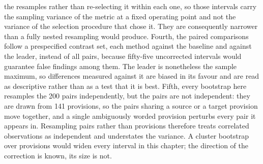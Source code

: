 the resamples rather than re-selecting it within each one, so those intervals
carry the sampling variance of the metric at a fixed operating point and not the
variance of the selection procedure that chose it. They are consequently
narrower than a fully nested resampling would produce. Fourth, the paired
comparisons follow a prespecified contrast set, each method
against the baseline and against the leader, instead of all pairs, because
fifty-five uncorrected intervals would guarantee false findings among them. The
leader is nonetheless the sample maximum, so differences measured against it are
biased in its favour and are read as descriptive rather than as a test that it is
best. Fifth, every bootstrap here resamples the 200 pairs independently, but the
pairs are not independent: they are drawn from 141 provisions, so the pairs sharing
a source or a target provision move together, and a single ambiguously worded
provision perturbs every pair it appears in. Resampling pairs rather than
provisions therefore treats correlated observations as independent and understates
the variance. A cluster bootstrap over provisions would widen every interval in
this chapter; the direction of the correction is known, its size is not.
